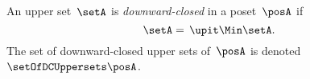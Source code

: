 %

\begin{definition}
    \label{def:downward-closed-upperset}
    An upper set~$\setA$ is \emph{downward-closed} in a poset~$\posA$ if
    \begin{equation}
        \setA =\, \upit  \Min \setA.
    \end{equation}
    The set of downward-closed upper sets of~$\posA$ is denoted~$\setOfDCUppersets \posA$.

\end{definition}


